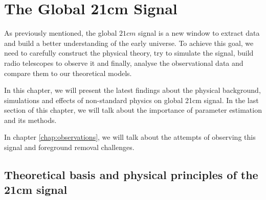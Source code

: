\documentclass[12pt, TexShade, letterpaper]{report}
\begin{document}
\chapter{The Global 21cm Signal}
\label{chap:global21cm}
As previously mentioned, the global $21cm$ signal is a new window to extract data and build a better understanding of the early universe. To achieve this goal, we need to carefully construct the physical theory, try to simulate the signal, build radio telescopes to observe it and finally, analyse the observational data and compare them to our theoretical models.\par
In this chapter, we will present the latest findings about the physical background, simulations and effects of non-standard physics on global 21cm signal. In the last section of this chapter, we will talk about the importance of parameter estimation and its methods.\par
In chapter \ref{chap:observations}, we will talk about the attempts of observing this signal and foreground removal challenges.\par
\section{Theoretical basis and physical principles of the 21cm signal}
\label{chap:global21cm,sub:physics}
\end{document}
